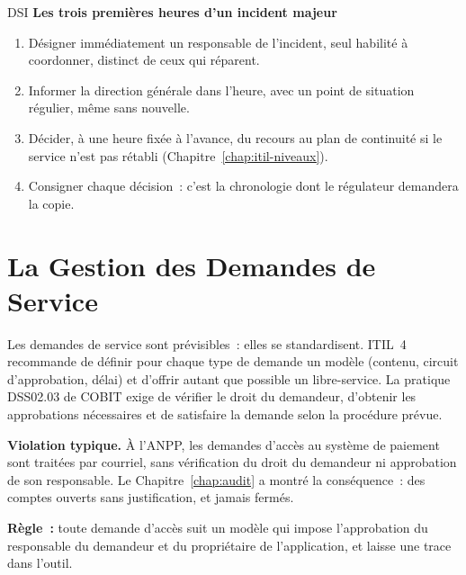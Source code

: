 \begin{boxmetier}{DSI}
\textbf{Les trois premières heures d'un incident majeur}
\begin{enumerate}
    \item Désigner immédiatement un responsable de l'incident, seul habilité
          à coordonner, distinct de ceux qui réparent.
    \item Informer la direction générale dans l'heure, avec un point de
          situation régulier, même sans nouvelle.
    \item Décider, à une heure fixée à l'avance, du recours au plan de
          continuité si le service n'est pas rétabli
          (Chapitre~\ref{chap:itil-niveaux}).
    \item Consigner chaque décision~: c'est la chronologie dont le
          régulateur demandera la copie.
\end{enumerate}
\end{boxmetier}

\section{La Gestion des Demandes de Service}
\label{sec:c13-demandes}

Les demandes de service sont prévisibles~: elles se standardisent. ITIL~4
recommande de définir pour chaque type de demande un modèle (contenu,
circuit d'approbation, délai) et d'offrir autant que possible un
libre-service. La pratique DSS02.03 de COBIT exige de vérifier le droit du
demandeur, d'obtenir les approbations nécessaires et de satisfaire la
demande selon la procédure prévue.

\begin{boxalert}
\textbf{Violation typique.} À l'ANPP, les demandes d'accès au système de
paiement sont traitées par courriel, sans vérification du droit du
demandeur ni approbation de son responsable. Le Chapitre~\ref{chap:audit}
a montré la conséquence~: des comptes ouverts sans justification, et
jamais fermés.

\smallskip
\textbf{Règle~:} toute demande d'accès suit un modèle qui impose
l'approbation du responsable du demandeur et du propriétaire de
l'application, et laisse une trace dans l'outil.
\end{boxalert}

